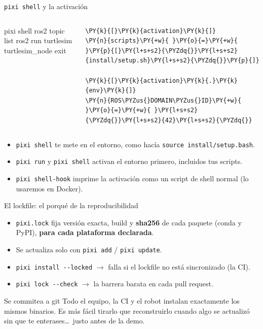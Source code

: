 \documentclass[aspectratio=169]{beamer}
\begin{document}
\begin{frame}[fragile]{\texttt{pixi shell} y la activación}
\begin{columns}[T]
\begin{terminal}
pixi shell
ros2 topic list
ros2 run turtlesim turtlesim_node
exit
\end{terminal}
\begin{filelisting}
\begin{Verbatim}[commandchars=\\\{\},breaklines,breakanywhere]
\PY{k}{[}\PY{k}{activation}\PY{k}{]}
\PY{n}{scripts}\PY{+w}{ }\PY{o}{=}\PY{+w}{ }\PY{p}{[}\PY{l+s+s2}{\PYZdq{}}\PY{l+s+s2}{install/setup.sh}\PY{l+s+s2}{\PYZdq{}}\PY{p}{]}

\PY{k}{[}\PY{k}{activation}\PY{k}{.}\PY{k}{env}\PY{k}{]}
\PY{n}{ROS\PYZus{}DOMAIN\PYZus{}ID}\PY{+w}{ }\PY{o}{=}\PY{+w}{ }\PY{l+s+s2}{\PYZdq{}}\PY{l+s+s2}{42}\PY{l+s+s2}{\PYZdq{}}
\end{Verbatim}
\end{filelisting}
\end{columns}
\vfill
\begin{itemize}
    \item \lstinline|pixi shell| te mete en el entorno, como hacía \lstinline|source install/setup.bash|.
    \item \lstinline|pixi run| y \lstinline|pixi shell| activan el entorno primero, incluidos tus scripts.
    \item \lstinline|pixi shell-hook| imprime la activación como un script de shell normal (lo usaremos en Docker).
\end{itemize}
\end{frame}

\begin{frame}{El lockfile: el porqué de la reproducibilidad}
\begin{itemize}
    \item \lstinline|pixi.lock| fija versión exacta, build y \textbf{sha256} de cada paquete (conda y PyPI), \textbf{para cada plataforma declarada}.
    \item Se actualiza solo con \lstinline|pixi add| / \lstinline|pixi update|.
    \item \lstinline|pixi install --locked| $\rightarrow$ falla si el lockfile no está sincronizado (la CI).
    \item \lstinline|pixi lock --check| $\rightarrow$ la barrera barata en cada pull request.
\end{itemize}
\vfill
\begin{block}{Se commitea a git}
Todo el equipo, la CI y el robot instalan exactamente los mismos binarios. Es más fácil tirarlo que reconstruirlo cuando algo se actualizó sin que te enterases\ldots\ justo antes de la demo.
\end{block}
\end{frame}
\end{document}
